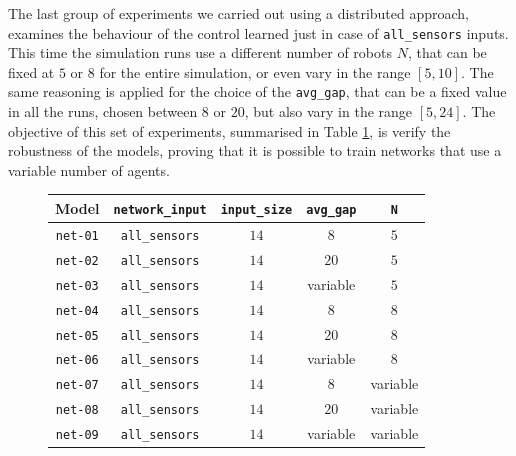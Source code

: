 The last group of experiments we carried out using a distributed approach, 
examines the behaviour of the control learned just in case of \texttt{all\_sensors} 
inputs. This time the simulation runs use a different number of robots $N$, that 
can be fixed at $5$ or $8$ for the entire simulation, or even vary in the range 
$[5, 10]$. The same reasoning is applied for the choice of the \texttt{avg\_gap}, 
that can be a fixed value in all the runs, chosen between $8$ or $20$, but also 
vary in the range $[5, 24]$. 
The objective of this set of experiments, summarised in Table \ref{tab:modeldist}, 
is verify the robustness of the models, proving that it is possible to train networks 
that use a variable number of agents. 
\begin{figure}[!htb]
	\centering
	\begin{tabular}{ccccc}
		\toprule
		\textbf{Model} \quad & \textbf{\texttt{network\_input}} & 
		\textbf{\texttt{input\_size}} & \textbf{\texttt{avg\_gap}} & \textbf{\texttt{N}}\\
		\midrule
		\texttt{net-01} 	& \texttt{all\_sensors}		&  $14$  &  $8$		 	 &	 $5$ \\
		\texttt{net-02} 	& \texttt{all\_sensors}		&  $14$  &  $20$		&	$5$ \\
		\texttt{net-03} 	& \texttt{all\_sensors}		&  $14$  &  variable   &	$5$ \\
		\texttt{net-04} 	& \texttt{all\_sensors}	  	&  $14$  &  $8$			 &	  $8$ \\
		\texttt{net-05} 	& \texttt{all\_sensors}	  	&  $14$  &  $20$   		&	 $8$ \\
		\texttt{net-06} 	& \texttt{all\_sensors}	  	&  $14$  &  variable	&	 $8$ \\
		\texttt{net-07} 	& \texttt{all\_sensors}	  	&  $14$  &  $ 8$		  &	 variable\\
		\texttt{net-08} 	& \texttt{all\_sensors}	  	&  $14$  &  $20$		 &	variable\\
		\texttt{net-09} 	& \texttt{all\_sensors}	  	&  $14$  &  variable	 &	variable\\
		\bottomrule
	\end{tabular}
	\label{tab:modeldist}
\end{figure}


